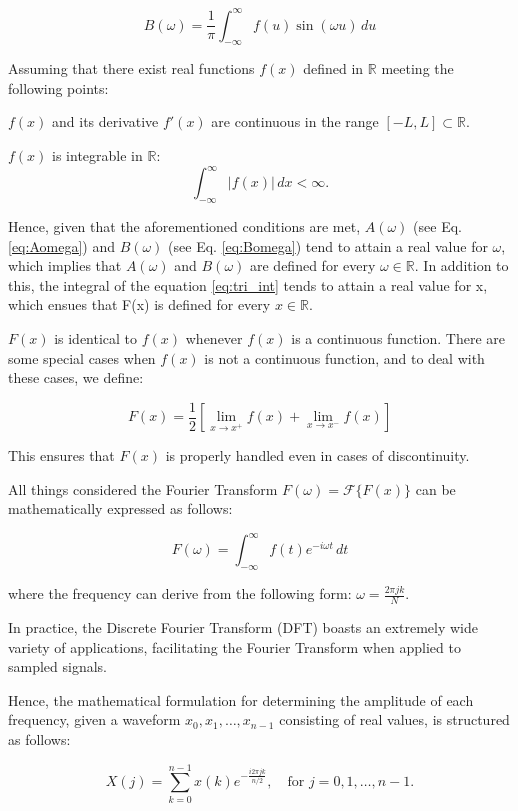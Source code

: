 {\begin{equation}
    B(\omega) = \frac{1}{\pi} \int_{-\infty}^{\infty} f(u) \sin(\omega u) \,du
    \label{eq:Bomega}
\end{equation}

Assuming that there exist real functions \( f(x) \) defined in \( \mathbb{R} \) meeting the following points: 
\begin{itemize}
{
    \item \( f(x) \) and its derivative \( f'(x) \) are continuous in the range \( [-L, L] \subset \mathbb{R} \).
    \item \( f(x) \) is integrable in \( \mathbb{R} \):
	\[
    \int_{-\infty}^{\infty} |f(x)| \,dx < \infty.
    \]
}
\end{itemize}

Hence, given that the aforementioned conditions are met, \( A(\omega) \) (see Eq. \eqref{eq:Aomega}) and \( B(\omega) \) (see Eq. \eqref{eq:Bomega}) tend to attain a real value for \( \omega \), which implies that \( A(\omega) \) and \( B(\omega) \) are defined for every \( \omega \in \mathbb{R} \). In addition to this, the integral of the equation \eqref{eq:tri_int} tends to attain a real value for x, which ensues that F(x) is defined for every \( x \in \mathbb{R} \).

\( F(x) \) is identical to \( f(x) \) whenever \( f(x) \) is a continuous function. 
There are some special cases when \( f(x) \) is not a continuous function, and to deal with these cases, we define:

\begin{equation}
    F(x) = \frac{1}{2} \left[ \lim_{x \to x^+} f(x) + \lim_{x \to x^-} f(x) \right]
\end{equation}

This ensures that \( F(x) \) is properly handled even in cases of discontinuity.

All things considered the Fourier Transform \( F(\omega) = \mathcal{F} \{ F(x) \} \) can be mathematically expressed as follows:


\begin{equation}
    F(\omega) = \int_{-\infty}^{\infty} f(t) e^{-i \omega t} \,dt
\end{equation}


where the frequency can derive from the following form: \( \omega = \frac{2\pi j k}{N} \).

In practice, the Discrete Fourier Transform (DFT) boasts an extremely wide variety of applications, facilitating the Fourier Transform when applied to sampled signals. 

Hence, the mathematical formulation for determining the amplitude of each frequency, given a waveform \( x_0, x_1, \dots, x_{n-1} \) consisting of real values, is structured as follows:

\begin{equation}
    X(j) = \sum_{k=0}^{n-1} x(k) e^{ - \frac{i 2\pi jk}{n/2} }, \quad \text{for } j = 0,1,\dots,n-1.
    \label{eq:DFT}
\end{equation}
}
